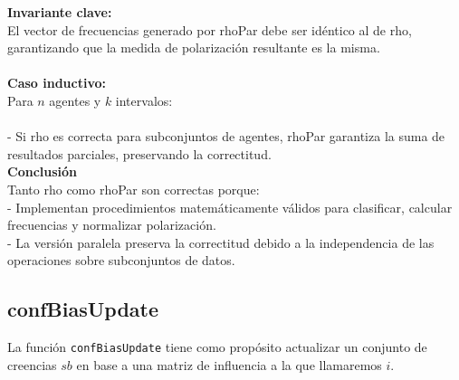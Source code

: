 \documentclass{article}
\begin{document}
    \textbf{Invariante clave:}\\
    El vector de frecuencias generado por rhoPar debe ser idéntico al de rho, garantizando que la medida de polarización resultante es la misma.\\\\
    \textbf{Caso inductivo:}\\
    Para $n$ agentes y $k$ intervalos:\\\\
    - Si rho es correcta para subconjuntos de agentes, rhoPar garantiza la suma de resultados parciales, preservando la correctitud.\\
  
    \textbf{Conclusión} \\
    Tanto rho como rhoPar son correctas porque:\\
    -  Implementan procedimientos matemáticamente válidos para clasificar, calcular frecuencias y normalizar polarización.\\
    -  La versión paralela preserva la correctitud debido a la independencia de las operaciones sobre subconjuntos de datos.
        

\subsection{confBiasUpdate}
	
	La función \texttt{confBiasUpdate} tiene como propósito actualizar un conjunto de creencias $sb$ en base a una matriz de influencia a la que llamaremos $i$.
  \\
\end{document}
